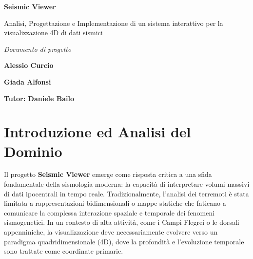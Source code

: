 \documentclass[12pt,a4paper]{article}
\begin{document}
\begin{titlepage}
    \centering
    \vspace*{2cm}
    {\huge\bfseries Seismic Viewer \par}
    \vspace{0.5cm}
    {\Large Analisi, Progettazione e Implementazione di un sistema interattivo per la visualizzazione 4D di dati sismici \par}
    \vspace{2cm}
    {\large\itshape Documento di progetto \par}
    \vspace{3cm}
    \vfill
    {\large\bfseries Alessio Curcio\par}
    {\large\bfseries Giada Alfonsi\par}
    {\large\bfseries Tutor: Daniele Bailo\par}

\end{titlepage}

\newpage
\tableofcontents
\newpage

\begin{abstract}
Il presente documento descrive la progettazione e l'implementazione di \textbf{Seismic Viewer}, un'applicazione desktop avanzata per l'analisi e la visualizzazione quadridimensionale (spazio-temporale) di dataset sismologici. Il sistema integra un backend Python basato su calcolo vettoriale e algoritmi di clustering spaziale con un frontend interattivo accelerato hardware. Particolare enfasi è stata posta sull'ottimizzazione delle performance di rendering e sulla robustezza dell'architettura di comunicazione, implementando standard di sicurezza moderni per la protezione dell'integrità dei dati e della disponibilità del sistema.
\end{abstract}

\newpage\section{Introduzione ed Analisi del Dominio}
Il progetto \textbf{Seismic Viewer} emerge come risposta critica a una sfida fondamentale della sismologia moderna: la capacità di interpretare volumi massivi di dati ipocentrali in tempo reale. Tradizionalmente, l'analisi dei terremoti è stata limitata a rappresentazioni bidimensionali o mappe statiche che faticano a comunicare la complessa interazione spaziale e temporale dei fenomeni sismogenetici. In un contesto di alta attività, come i Campi Flegrei o le dorsali appenniniche, la visualizzazione deve necessariamente evolvere verso un paradigma quadridimensionale (4D), dove la profondità e l'evoluzione temporale sono trattate come coordinate primarie.
\end{document}
